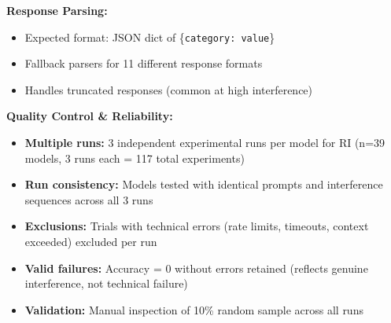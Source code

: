 \documentclass{article}
\begin{document}
\begin{center}
\end{center}

\textbf{Response Parsing:}
\begin{itemize}[itemsep=2pt,topsep=3pt,parsep=0pt]
    \item Expected format: JSON dict of \{\texttt{category: value}\}
    \item Fallback parsers for 11 different response formats
    \item Handles truncated responses (common at high interference)
\end{itemize}

\textbf{Quality Control \& Reliability:}
\begin{itemize}[itemsep=2pt,topsep=3pt,parsep=0pt]
    \item \textbf{Multiple runs:} 3 independent experimental runs per model for RI (n=39 models, 3 runs each = 117 total experiments)
    \item \textbf{Run consistency:} Models tested with identical prompts and interference sequences across all 3 runs
    \item \textbf{Exclusions:} Trials with technical errors (rate limits, timeouts, context exceeded) excluded per run
    \item \textbf{Valid failures:} Accuracy = 0 without errors retained (reflects genuine interference, not technical failure)
    \item \textbf{Validation:} Manual inspection of 10\% random sample across all runs
\end{itemize}
\end{document}
